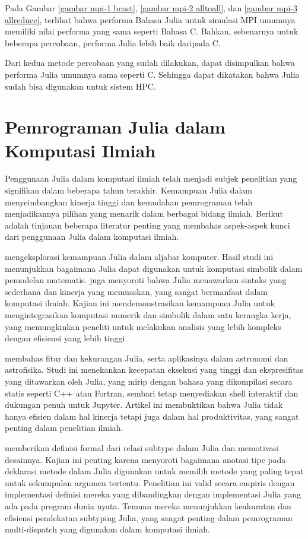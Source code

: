 Pada Gambar \ref{gambar mpi-1 bcast}, \ref{gambar mpi-2 alltoall}, dan
\ref{gambar mpi-3 allreduce}, terlihat bahwa performa Bahasa Julia untuk
simulasi MPI umumnya memiliki nilai performa yang sama seperti Bahasa C.
Bahkan, sebenarnya untuk beberapa percobaan, performa Julia lebih baik daripada
C.

Dari kedua metode percobaan yang sudah dilakukan, dapat disimpulkan bahwa
performa Julia umumnya sama seperti C. Sehingga dapat dikatakan bahwa Julia
sudah bisa digunakan untuk sistem HPC.

\section{Pemrograman Julia dalam Komputasi Ilmiah}

Penggunaan Julia dalam komputasi ilmiah telah menjadi subjek penelitian yang
signifikan dalam beberapa tahun terakhir. Kemampuan Julia dalam menyeimbangkan
kinerja tinggi dan kemudahan pemrograman telah menjadikannya pilihan yang
menarik dalam berbagai bidang ilmiah. Berikut adalah tinjauan beberapa
literatur penting yang membahas aspek-aspek kunci dari penggunaan Julia dalam
komputasi ilmiah.

\cite{kulyabovComputerAlgebraJULIA2021} mengeksplorasi kemampuan Julia dalam aljabar
komputer. Hasil studi ini menunjukkan bagaimana Julia dapat digunakan untuk
komputasi simbolik dalam pemodelan matematis. \cite{kulyabovComputerAlgebraJULIA2021}
juga menyoroti bahwa Julia menawarkan sintaks yang sederhana dan kinerja yang memuaskan,
yang sangat bermanfaat dalam komputasi ilmiah. Kajian ini mendemonstrasikan kemampuan
Julia untuk mengintegrasikan komputasi numerik dan simbolik dalam satu kerangka kerja,
yang memungkinkan peneliti untuk melakukan analisis yang lebih kompleks dengan
efisiensi yang lebih tinggi.

\cite{tomasiNewSolutionsScientific2018} membahas fitur dan kekurangan Julia, serta
aplikasinya dalam astronomi dan astrofisika. Studi ini menekankan kecepatan
eksekusi yang tinggi dan ekspresifitas yang ditawarkan oleh Julia, yang mirip dengan
bahasa yang dikompilasi secara statis seperti C++ atau Fortran, sembari tetap
menyediakan shell interaktif dan dukungan penuh untuk Jupyter. Artikel ini membuktikan
bahwa Julia tidak hanya efisien dalam hal kinerja tetapi juga dalam hal produktivitas,
yang sangat penting dalam penelitian ilmiah.

\cite{zappanardelliJuliaSubtypingRational2018} memberikan definisi formal dari
relasi subtype dalam Julia dan memotivasi desainnya. Kajian ini penting karena menyoroti
bagaimana anotasi tipe pada deklarasi metode dalam Julia digunakan untuk memilih
metode yang paling tepat untuk sekumpulan argumen tertentu. Penelitian ini valid
secara empiris dengan implementasi definisi mereka yang dibandingkan dengan
implementasi Julia yang ada pada program dunia nyata. Temuan mereka menunjukkan keakuratan
dan efisiensi pendekatan subtyping Julia, yang sangat penting dalam pemrograman
multi-dispatch yang digunakan dalam komputasi ilmiah.

